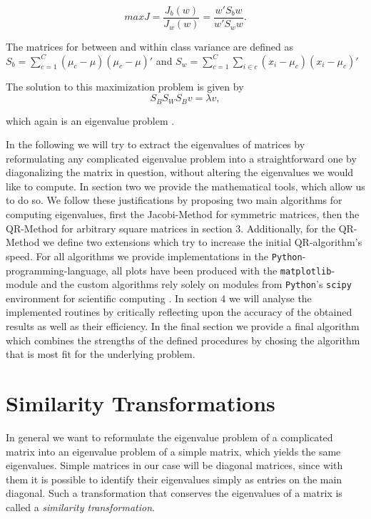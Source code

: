 \documentclass[12pt]{article}
\begin{document}
\begin{equation}
\label{LDA}
max J = \frac{J_b(w)}{J_w(w)} = \frac{w \prime S_{b} w}{w \prime S_{w} w}.
\end{equation}

The matrices for between and within class variance are defined as $S_b = \sum_{c=1}^{C}(\mu_c - \mu)(\mu_c - \mu)\prime$ and $S_w = \sum_{c=1}^{C}\sum_{i \in c}(x_i - \mu_c)(x_i - \mu_c)\prime$

The solution to this maximization problem is given by
\begin{equation}
S_B S_W S_B v = \lambda v,
\end{equation}

which again is an eigenvalue problem \cite{duda}.

In the following we will try to extract the eigenvalues of matrices by reformulating any complicated eigenvalue problem into a straightforward one by diagonalizing the matrix in question, without altering the eigenvalues we would like to compute. In section two we provide the mathematical tools, which allow us to do so. We follow these justifications by proposing two main algorithms for computing eigenvalues, first the Jacobi-Method for symmetric matrices, then the QR-Method for arbitrary square matrices in section 3. Additionally, for the QR-Method we define two extensions which try to increase the initial QR-algorithm's speed.
For all algorithms we provide implementations in the \texttt{Python}-programming-language, all plots have been produced with the \texttt{matplotlib}-module and the custom algorithms rely solely on modules from \texttt{Python}'s \texttt{scipy} environment for scientific computing \cite{python, matplotlib, scipy}. In section 4 we will analyse the implemented routines by critically reflecting upon the accuracy of the obtained results as well as their efficiency. In the final section we provide a final algorithm which combines the strengths of the defined procedures by chosing the algorithm that is most fit for the underlying problem.
\section{Similarity Transformations}

In general we want to reformulate the eigenvalue problem of a complicated matrix into an eigenvalue problem of a simple matrix, which yields the same eigenvalues. Simple matrices in our case will be diagonal matrices, since with them it is possible to identify their eigenvalues simply as entries on the main diagonal. Such a transformation that conserves the eigenvalues of a matrix is called a \textit{similarity transformation}. 
\end{document}
